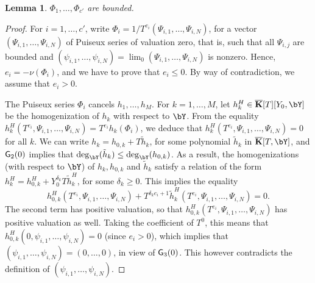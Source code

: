 \documentclass[12pt]{article}
\newtheorem{lemma}[definition]{Lemma}
\begin{document}
\begin{lemma}
   $\Phi_1,\dots,\Phi_{c'}$ are bounded.
\end{lemma}
\begin{proof}
  For $i=1,\dots,c'$, write $\Phi_i=1/T^{e_i}
  (\Psi_{i,1},\dots,\Psi_{i,N})$, for a vector
  $(\Psi_{i,1},\dots,\Psi_{i,N})$ of Puiseux series of valuation
  zero, that is, such that all $\Psi_{i,j}$ are bounded and
  $(\psi_{i,1},\dots,\psi_{i,N})=\lim_0(\Psi_{i,1},\dots,\Psi_{i,N})$
  is nonzero. Hence,
  $e_i=-\nu(\Phi_i)$, and we have to prove that $e_i \le 0$.  By way
  of contradiction, we assume that $e_i > 0$.

  The Puiseux series $\Phi_i$ cancels $h_1,\dots,h_M$. For
  $k=1,\dots,M$, let $h_k^H \in \KKbar[T][Y_0,\bY]$ be the homogenization
  of $h_k$ with respect to $\bY$. From the equality
  $h_k^H(T^{e_i},\Psi_{i,1},\dots,\Psi_{i,N})=
  T^{e_i}h_k(\Phi_i)$, we deduce that
  $h_k^H(T^{e_i},\Psi_{i,1},\dots,\Psi_{i,N})=0$ for all $k$. We
  can write $h_k = h_{0,k} + T \tilde h_k$, for some polynomial
  $\tilde h_k$ in $\KKbar[T,\bY]$, and ${\sf G}_2(0)$ implies that
  $\deg_\bY(\tilde h_k) \le \deg_\bY(h_{0,k})$. As a result, the
  homogenizations (with respect to $\bY$) of $h_{k},h_{0,k}$ and $\tilde
  h_k$ satisfy a relation of the form $h^H_k = h_{0,k}^H +
  Y_0^{\delta_k} T \tilde h^H_k$, for some $\delta_k \ge 0$. This
  implies the equality
  $$h_{0,k}^H(T^{e_i},\Psi_{i,1},\dots,\Psi_{i,N}) + T^{\delta_k
    e_i+1}\tilde h_k^H(T^{e_i},\Psi_{i,1},\dots,\Psi_{i,N})=0.$$
  The second term has positive valuation, so that
  $h_{0,k}^H(T^{e_i},\Psi_{i,1},\dots,\Psi_{i,N})$ has positive
  valuation as well. Taking the coefficient of $T^0$, this means 
  that $h_{0,k}^H(0,\psi_{i,1},\dots,\psi_{i,N})=0$ (since $e_i > 0$), which implies 
  that $(\psi_{i,1},\dots,\psi_{i,N})=(0,\dots,0)$, in view of ${\sf G}_3(0)$.
  This however contradicts the definition of $(\psi_{i,1},\dots,\psi_{i,N})$.
\end{proof}

\end{document}
